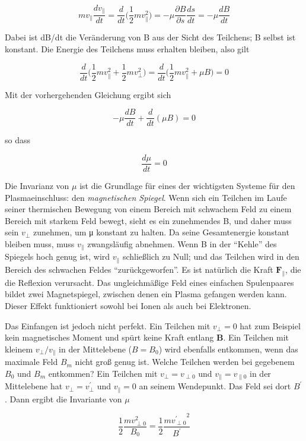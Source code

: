 \documentclass[
  a4paper,
  DIV=11]{scrreprt}
\begin{document}
\[
mv_\parallel \frac{dv_\parallel}{dt} = \frac{d}{dt}\Big( \frac{1}{2}mv_\parallel^2 \Big) = -\mu\frac{\partial B}{\partial s}\frac{ds}{dt} = -\mu\frac{dB}{dt}
\]

Dabei ist dB/dt die Veränderung von B aus der Sicht des Teilchens; B
selbst ist konstant. Die Energie des Teilchens muss erhalten bleiben,
also gilt

\[
\frac{d}{dt}\Big( \frac{1}{2}mv_\parallel^2 + \frac{1}{2}mv_\perp^2 \Big) = \frac{d}{dt}\Big( \frac{1}{2}mv_\parallel^2 + \mu B \Big) = 0
\]

Mit der vorhergehenden Gleichung ergibt sich

\[
-\mu\frac{dB}{dt} + \frac{d}{dt}(\mu B) = 0
\]

so dass

\[
\frac{d\mu}{dt} = 0
\]

Die Invarianz von \(\mu\) ist die Grundlage für eines der wichtigsten
Systeme für den Plasmaeinschluss: den \emph{magnetischen Spiegel}. Wenn
sich ein Teilchen im Laufe seiner thermischen Bewegung von einem Bereich
mit schwachem Feld zu einem Bereich mit starkem Feld bewegt, sieht es
ein zunehmendes B, und daher muss sein \(v_\perp\) zunehmen, um μ
konstant zu halten. Da seine Gesamtenergie konstant bleiben muss, muss
\(v_\parallel\) zwangsläufig abnehmen. Wenn B in der ``Kehle'' des
Spiegels hoch genug ist, wird \(v_\parallel\) schließlich zu Null; und
das Teilchen wird in den Bereich des schwachen Feldes
``zurückgeworfen''. Es ist natürlich die Kraft \(\mathbf{F}_\parallel\),
die die Reflexion verursacht. Das ungleichmäßige Feld eines einfachen
Spulenpaares bildet zwei Magnetspiegel, zwischen denen ein Plasma
gefangen werden kann. Dieser Effekt funktioniert sowohl bei Ionen als
auch bei Elektronen.

Das Einfangen ist jedoch nicht perfekt. Ein Teilchen mit \(v_\perp = 0\)
hat zum Beispiel kein magnetisches Moment und spürt keine Kraft entlang
\(\mathbf{B}\). Ein Teilchen mit kleinem \(v_\perp / v_\parallel\) in
der Mittelebene (\(B = B_0\)) wird ebenfalls entkommen, wenn das
maximale Feld \(B_m\) nicht groß genug ist. Welche Teilchen werden bei
gegebenem \(B_0\) und \(B_m\) entkommen? Ein Teilchen mit
\(v_\perp = v_{\perp 0}\) und \(v_\parallel = v_{\parallel 0}\) in der
Mittelebene hat \(v_\perp = v_\perp^\prime\) und \(v_\parallel = 0\) an
seinem Wendepunkt. Das Feld sei dort \(B^\prime\). Dann ergibt die
Invariante von \(\mu\)

\[
\frac{1}{2}\frac{mv_{\perp 0}^2}{B_0} = \frac{1}{2}\frac{m{v_{\perp 0}^{\prime}}^2}{B^\prime}
\]
\end{document}
